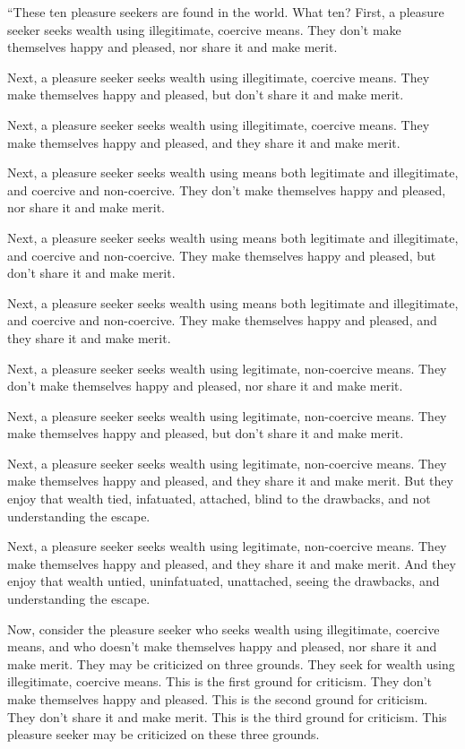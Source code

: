 \documentclass[12pt,openany]{book}%
\begin{document}
“These ten pleasure seekers are found in the world. What ten? First, a pleasure seeker seeks wealth using illegitimate, coercive means. They don’t make themselves happy and pleased, nor share it and make merit. 

Next, a pleasure seeker seeks wealth using illegitimate, coercive means. They make themselves happy and pleased, but don’t share it and make merit. 

Next, a pleasure seeker seeks wealth using illegitimate, coercive means. They make themselves happy and pleased, and they share it and make merit. 

Next, a pleasure seeker seeks wealth using means both legitimate and illegitimate, and coercive and non-coercive. They don’t make themselves happy and pleased, nor share it and make merit. 

Next, a pleasure seeker seeks wealth using means both legitimate and illegitimate, and coercive and non-coercive. They make themselves happy and pleased, but don't share it and make merit. 

Next, a pleasure seeker seeks wealth using means both legitimate and illegitimate, and coercive and non-coercive. They make themselves happy and pleased, and they share it and make merit. 

Next, a pleasure seeker seeks wealth using legitimate, non-coercive means. They don’t make themselves happy and pleased, nor share it and make merit. 

Next, a pleasure seeker seeks wealth using legitimate, non-coercive means. They make themselves happy and pleased, but don’t share it and make merit. 

Next, a pleasure seeker seeks wealth using legitimate, non-coercive means. They make themselves happy and pleased, and they share it and make merit. But they enjoy that wealth tied, infatuated, attached, blind to the drawbacks, and not understanding the escape. 

Next, a pleasure seeker seeks wealth using legitimate, non-coercive means. They make themselves happy and pleased, and they share it and make merit. And they enjoy that wealth untied, uninfatuated, unattached, seeing the drawbacks, and understanding the escape. 

Now, consider the pleasure seeker who seeks wealth using illegitimate, coercive means, and who doesn’t make themselves happy and pleased, nor share it and make merit. They may be criticized on three grounds. They seek for wealth using illegitimate, coercive means. This is the first ground for criticism. They don’t make themselves happy and pleased. This is the second ground for criticism. They don’t share it and make merit. This is the third ground for criticism. This pleasure seeker may be criticized on these three grounds. 
\end{document}
